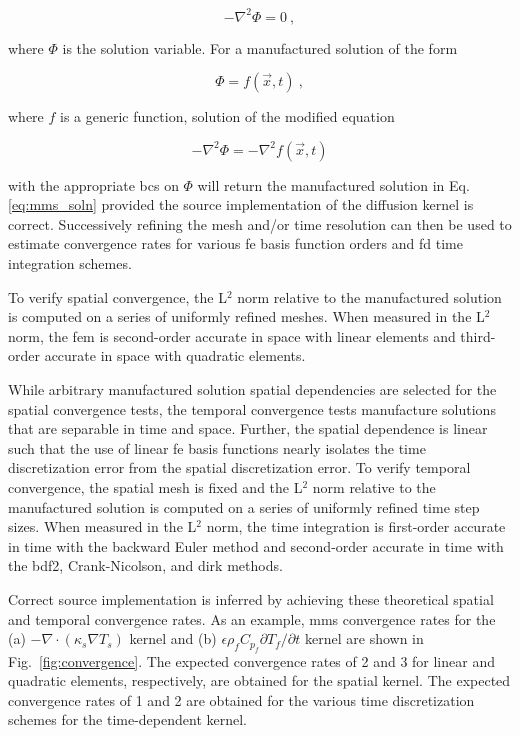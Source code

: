 \begin{equation}
\label{eq:diff_example}
-\nabla^2\Phi=0\ ,
\end{equation}
 
\noindent where \(\Phi\) is the solution variable. For a manufactured solution of the form

\begin{equation}
\label{eq:mms_soln}
\Phi=f(\vec{x},t)\ ,
\end{equation}

\noindent where \(f\) is a generic function, solution of the modified equation

\begin{equation}
-\nabla^2\Phi=-\nabla^2f(\vec{x},t)
\end{equation}

\noindent with the appropriate \glspl{bc} on \(\Phi\) will return the manufactured solution in Eq. \eqref{eq:mms_soln} provided the source implementation of the diffusion kernel is correct. Successively refining the mesh and/or time resolution can then be used to estimate convergence rates for various \gls{fe} basis function orders and \gls{fd} time integration schemes.

To verify spatial convergence, the L$^2$ norm relative to the manufactured solution is computed on a series of uniformly refined meshes. When measured in the L$^2$ norm, the \gls{fem} is second-order accurate in space with linear elements and third-order accurate in space with quadratic elements. 

While arbitrary manufactured solution spatial dependencies are selected for the spatial convergence tests, the temporal convergence tests manufacture solutions that are separable in time and space. Further, the spatial dependence is linear such that the use of linear \gls{fe} basis functions nearly isolates the time discretization error from the spatial discretization error. To verify temporal convergence, the spatial mesh is fixed and the L$^2$ norm relative to the manufactured solution is computed on a series of uniformly refined time step sizes. When measured in the L$^2$ norm, the time integration is first-order accurate in time with the backward Euler method and second-order accurate in time with the \gls{bdf2}, Crank-Nicolson, and \gls{dirk} methods. 

Correct source implementation is inferred by achieving these theoretical spatial and temporal convergence rates. As an example, \gls{mms} convergence rates for the (a) \(-\nabla\cdot(\kappa_s\nabla T_s)\) kernel and (b) \(\epsilon\rho_fC_{p_f}\partial T_f/\partial t\) kernel are shown in Fig.\ \ref{fig:convergence}. The expected convergence rates of 2 and 3 for linear and quadratic elements, respectively, are obtained for the spatial kernel. The expected convergence rates of 1 and 2 are obtained for the various time discretization schemes for the time-dependent kernel.

